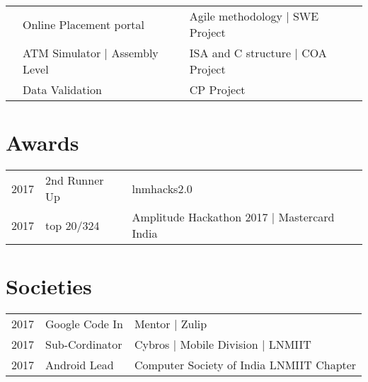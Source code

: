 \documentclass[letterpaper]{deedy-resume} %
\begin{document}
\begin{minipage}[t]{0.66\textwidth}

\sectionspace %

\begin{tabular}{rll}
\textbullet{}	 & Online Placement portal & Agile methodology | SWE Project\\
\textbullet{}	 & ATM Simulator | Assembly Level & ISA and C structure | COA Project\\
\textbullet{}	 & Data Validation & CP Project\\
\end{tabular}

\sectionspace %


\section{Awards}

\begin{tabular}{rll}
2017	 & 2nd Runner Up & lnmhacks2.0\\
2017	 & top 20/324 & Amplitude Hackathon 2017 | Mastercard India \\
\end{tabular}

\sectionspace %


\section{Societies}

\begin{tabular}{rll}
2017 & Google Code In & Mentor | Zulip\\
2017 & Sub-Cordinator & Cybros | Mobile Division | LNMIIT\\
2017 & Android Lead & Computer Society of India LNMIIT Chapter\\
\end{tabular}

\sectionspace %


\end{minipage} %
\end{document}
